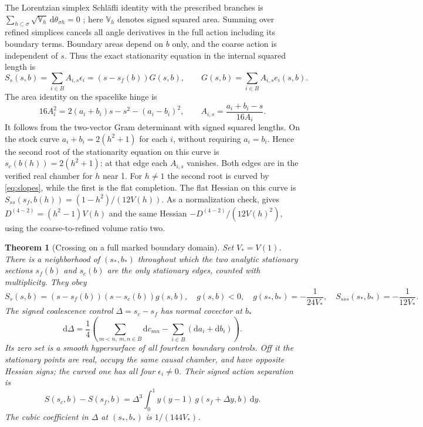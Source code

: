 \documentclass[11pt]{article}
\newtheorem{theorem}{Theorem}
\newcommand{\dd}{\mathrm d}
\begin{document}
The Lorentzian simplex Schläfli identity with the prescribed branches is
\(\sum_{h\subset \sigma}\sqrt{\mathbb V_h}\,\dd\theta_{\sigma h}=0\) \cite[App.~A.6]{BD}; here \(\mathbb V_h\) denotes signed squared area. Summing over refined simplices cancels all angle derivatives in the full action including its boundary terms. Boundary areas depend on \(b\) only, and the coarse action is independent of \(s\). Thus the exact stationarity equation in the internal squared length is
\begin{equation}\label{eq:Ss}
 S_s(s,b)=\sum_{i\in B} A_{i,s}\epsilon_i
     =(s-s_f(b))G(s,b),\qquad G(s,b)=\sum_{i\in B} A_{i,s}e_i(s,b).
\end{equation}
The area identity on the spacelike hinge is
\begin{equation}\label{eq:area}
 16 A_i^2=2(a_i+b_i)s-s^2-(a_i-b_i)^2,\qquad
 A_{i,s}=\frac{a_i+b_i-s}{16A_i}.
\end{equation}
It follows from the two-vector Gram determinant with signed squared lengths. On the stock curve \(a_i+b_i=2(h^2+1)\) for each \(i\), without requiring \(a_i=b_i\). Hence the second root of the stationarity equation on this curve is \(s_c(b(h))=2(h^2+1)\): at that edge each \(A_{i,s}\) vanishes. Both edges are in the verified real chamber for \(h\) near 1. For \(h\ne1\) the second root is curved by \eqref{eq:slopes}, while the first is the flat completion. The flat Hessian on this curve is \(S_{ss}(s_f,b(h))=(1-h^2)/(12V(h))\). As a normalization check, \cite[Eqs.~(55), (78)]{BD} gives \(D^{(4-2)}=(h^2-1)V(h)\) and the same Hessian \(-D^{(4-2)}/(12V(h)^2)\), using the coarse-to-refined volume ratio two.

\begin{theorem}[Crossing on a full marked boundary domain]\label{thm:crossing}
Set \(V_*=V(1)\). There is a neighborhood of \((s_*,b_*)\) throughout which the two analytic stationary sections \(s_f(b)\) and \(s_c(b)\) are the only stationary edges, counted with multiplicity. They obey
\begin{equation}\label{eq:fact}
 S_s(s,b)=(s-s_f(b))(s-s_c(b))g(s,b),\quad
 g(s,b)<0,\quad
 g(s_*,b_*)=-\frac{1}{24V_*},\quad
 S_{sss}(s_*,b_*)=-\frac{1}{12V_*}.
\end{equation}
The signed coalescence control \(\Delta=s_c-s_f\) has normal covector at \(b_*\)
\begin{equation}\label{eq:normal}
 \dd\Delta=\frac14\left(\sum_{m<n,\ m,n\in B}\dd c_{mn}
                       -\sum_{i\in B}(\dd a_i+\dd b_i)\right).
\end{equation}
Its zero set is a smooth hypersurface of all fourteen boundary controls. Off it the stationary points are real, occupy the same causal chamber, and have opposite Hessian signs; the curved one has all four \(\epsilon_i\ne0\). Their signed action separation is
\begin{equation}\label{eq:gap}
 S(s_c,b)-S(s_f,b)
   =\Delta^3\!\int_0^1 y(y-1)\,g(s_f+\Delta y,b)\,\dd y .
\end{equation}
The cubic coefficient in \(\Delta\) at \((s_*,b_*)\) is \(1/(144V_*)\).
\end{theorem}
\end{document}
